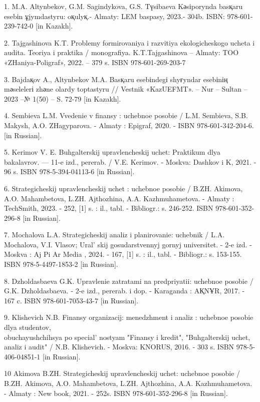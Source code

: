 \begin{references}

1. M.A. Altynbekov, G.M. Sagindykova, G.S. Tүsіbaeva Kәsіporynda basқaru
esebіn ұjymdastyru: oқulyқ.- Almaty: LEM baspasy, 2023.- 304b. ISBN:
978-601-239-742-0 {[}in Kazakh{]}.

2. Tajgashinova K.T. Problemy formirovaniya i razvitiya ekologicheskogo
ucheta i audita. Teoriya i praktika / monografiya. K.T.Tajgashinova --
Almaty: TOO «ZHaniya-Poligraf», 2022. -- 379 s. ISBN 978-601-269-203-7

3. Bajdaқov A., Altynbekov M.A. Basқaru esebіndegі shyғyndar esebіnің
mәselelerі zhәne olardy toptastyru // Vestnik «KazUEFMT». -- Nur --
Sultan -- 2023 --№ 1(50) -- S. 72-79 {[}in Kazakh{]}.

4. Sembieva L.M. Vvedenie v finansy : uchebnoe posobie / L.M. Sembieva,
S.B. Makysh, A.O. ZHagyparova. - Almaty : Epigraf, 2020. - ISBN
978-601-342-204-6. {[}in Russian{]}.

5. Kerimov V. E. Buhgalterskij upravlencheskij uchet: Praktikum dlya
bakalavrov. --- 11-e izd., pererab. / V.E. Kerimov. - Moskva: Dashkov i
K, 2021. - 96 s. ISBN 978-5-394-04113-6 {[}in Russian{]}.

6. Strategicheskij upravlencheskij uchet : uchebnoe posobie / B.ZH.
Akimova, A.O. Mahambetova, L.ZH. Ajthozhina, A.A. Kazhmuhametova. -
Almaty : TechSmith, 2023. - 252, {[}1{]} s. : il., tabl. - Bibliogr.: s.
246-252. ISBN 978-601-352-296-8 {[}in Russian{]}.

7. Mochalova L.A. Strategicheskij analiz i planirovanie: uchebnik / L.A.
Mochalova, V.I. Vlasov; Ural' skij gosudarstvennyj gornyj
universitet. - 2-e izd. - Moskva : Aj Pi Ar Media , 2024. - 167, {[}1{]}
s. : il., tabl. - Bibliogr.: s. 153-155. ISBN 978-5-4497-1853-2 {[}in
Russian{]}.

8. Dzholdasbaeva G.K. Upravlenie zatratami na predpriyatii: uchebnoe
posobie / G.K. Dzholdasbaeva. - 2-e izd., pererab. i dop. - Karaganda :
AҚNҰR, 2017. - 167 c. ISBN 978-601-7053-43-7 {[}in Russian{]}.

9. Klishevich N.B. Finansy organizacij: menedzhment i analiz : uchebnoe
posobie dlya studentov, \\obuchayushchihsya po
special' nostyam "Finansy i kredit", "Buhgalterskij
uchet, analiz i audit" / N.B. Klishevich. - Moskva: KNORUS, 2016. - 303
s. ISBN 978-5-406-04851-1 {[}in Russian{]}.

10 Akimova B.ZH. Strategicheskij upravlencheskij uchet: uchebnoe posobie
/ B.ZH. Akimova, A.O. Mahambetova, L.ZH. Ajthozhina, A.A.
Kazhmuhametova. - Almaty : New book, 2021. - 252s. ISBN
978-601-352-296-8 {[}in Russian{]}.


\end{references}
